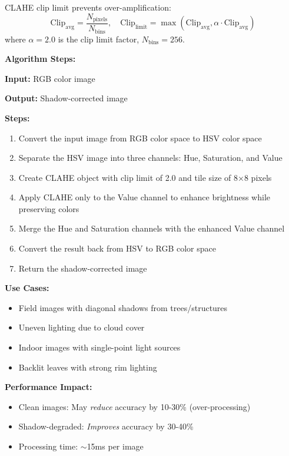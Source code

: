 \documentclass[12pt,a4paper]{article}
\begin{document}
CLAHE clip limit prevents over-amplification:
\begin{equation*}
    \text{Clip}_{\text{avg}} = \frac{N_{\text{pixels}}}{N_{\text{bins}}}, \quad
    \text{Clip}_{\text{limit}} = \max(\text{Clip}_{\text{avg}}, \alpha \cdot \text{Clip}_{\text{avg}})
\end{equation*}
where $\alpha = 2.0$ is the clip limit factor, $N_{\text{bins}} = 256$.

\textbf{Algorithm Steps:}

\textbf{Input:} RGB color image

\textbf{Output:} Shadow-corrected image

\textbf{Steps:}
\begin{enumerate}
    \item Convert the input image from RGB color space to HSV color space
    \item Separate the HSV image into three channels: Hue, Saturation, and Value
    \item Create CLAHE object with clip limit of 2.0 and tile size of 8×8 pixels
    \item Apply CLAHE only to the Value channel to enhance brightness while preserving colors
    \item Merge the Hue and Saturation channels with the enhanced Value channel
    \item Convert the result back from HSV to RGB color space
    \item Return the shadow-corrected image
\end{enumerate}

\textbf{Use Cases:}
\begin{itemize}
    \item Field images with diagonal shadows from trees/structures
    \item Uneven lighting due to cloud cover
    \item Indoor images with single-point light sources
    \item Backlit leaves with strong rim lighting
\end{itemize}

\textbf{Performance Impact:}
\begin{itemize}
    \item Clean images: May \textit{reduce} accuracy by 10-30\% (over-processing)
    \item Shadow-degraded: \textit{Improves} accuracy by 30-40\%
    \item Processing time: $\sim$15ms per image
\end{itemize}
\end{document}
